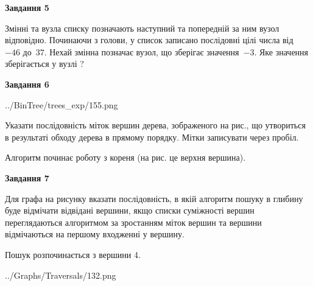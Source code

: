 \documentclass[12pt, ukrainian]{article}
\begin{document}
{\begin {large}
{\begin {center}\textbf{Завдання 5}\end {center}}\par
Змінні  та  вузла списку позначають наступний та попередній за ним вузол відповідно. Починаючи з голови, у список записано послідовні цілі числа від~$-46$ до~$37$. Нехай змінна  позначає вузол, що зберігає значення~$-3$.
Яке значення зберігається у вузлі  ?\par
\newpage

{\begin {center}\textbf{Завдання 6}\end {center}}\par

\begin{center}
	{../BinTree/trees_exp/155.png}
\end{center}
Указати послідовність міток вершин дерева, зображеного на рис., що утвориться в результаті обходу дерева в прямому порядку. Мітки записувати через пробіл.\par Алгоритм починає роботу з кореня (на рис. це верхня вершина).\par
\newpage

{\begin {center}\textbf{Завдання 7}\end {center}}\par
Для графа на рисунку вказати послідовність, в якій алгоритм пошуку в глибину буде відмічати відвідані вершини, якщо списки суміжності вершин переглядаються алгоритмом за зростанням міток вершин та вершини відмічаються на першому вход\-женні у вершину.\par
Пошук розпочинається з вершини 4.\par

\begin{center}
	{../Graphs/Traversals/132.png}
\end{center}\par
\newpage


\end{large}}
\end{document}
